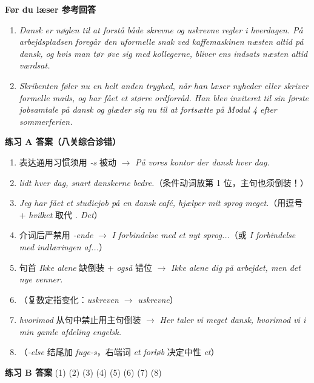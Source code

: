 \begin{answerbox}
\textbf{Før du læser 参考回答}
\begin{enumerate}
  \item \textit{Dansk er nøglen til at forstå både skrevne og uskrevne regler i hverdagen. På arbejdspladsen foregår den uformelle snak ved kaffemaskinen næsten altid på dansk, og hvis man tør øve sig med kollegerne, bliver ens indsats næsten altid værdsat.}
  \item \textit{Skribenten føler nu en helt anden tryghed, når han læser nyheder eller skriver formelle mails, og har fået et større ordforråd. Han blev inviteret til sin første jobsamtale på dansk og glæder sig nu til at fortsætte på Modul 4 efter sommerferien.}
\end{enumerate}

\textbf{练习 A 答案（八关综合诊错）}
\begin{enumerate}
  \item 表达通用习惯须用 \textit{-s} 被动 $\rightarrow$ \textit{På vores kontor  der dansk hver dag.}
  \item \textit{ lidt hver dag,  snart danskerne bedre.}（条件动词放第 1 位，主句也须倒装！）
  \item \textit{Jeg har fået et studiejob på en dansk café,  hjælper mit sprog meget.}（用逗号 + \textit{hvilket} 取代 \textit{. Det}）
  \item 介词后严禁用 \textit{-ende} $\rightarrow$ \textit{I forbindelse med  et nyt sprog...}（或 \textit{I forbindelse med indlæringen af...}）
  \item 句首 \textit{Ikke alene} 缺倒装 + \textit{også} 错位 $\rightarrow$ \textit{Ikke alene  dig på arbejdet, men det  nye venner.}
  \item {}（复数定指变化：\textit{uskreven $\rightarrow$ uskrevne}）
  \item \textit{hvorimod} 从句中禁止用主句倒装 $\rightarrow$ \textit{Her taler vi meget dansk, hvorimod vi i min gamle afdeling  engelsk.}
  \item {}（\textit{-else} 结尾加 \textit{fuge-s}，右端词 \textit{et forløb} 决定中性 \textit{et}）
\end{enumerate}

\textbf{练习 B 答案}
(1)  \quad (2)  \quad (3)  \quad (4)  \quad (5)  \quad (6)  \quad (7)  \quad (8) 


\end{answerbox}
